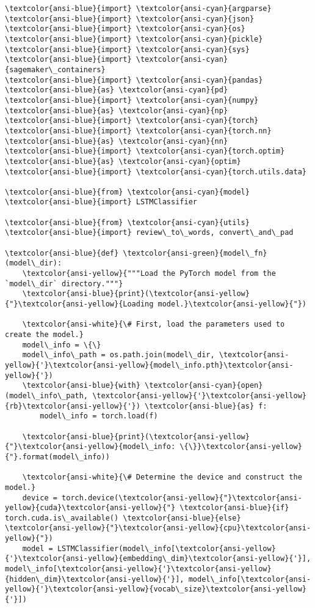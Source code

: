 \documentclass[11pt]{article}
\begin{document}
    \begin{Verbatim}[commandchars=\\\{\}]
\textcolor{ansi-blue}{import} \textcolor{ansi-cyan}{argparse}
\textcolor{ansi-blue}{import} \textcolor{ansi-cyan}{json}
\textcolor{ansi-blue}{import} \textcolor{ansi-cyan}{os}
\textcolor{ansi-blue}{import} \textcolor{ansi-cyan}{pickle}
\textcolor{ansi-blue}{import} \textcolor{ansi-cyan}{sys}
\textcolor{ansi-blue}{import} \textcolor{ansi-cyan}{sagemaker\_containers}
\textcolor{ansi-blue}{import} \textcolor{ansi-cyan}{pandas} \textcolor{ansi-blue}{as} \textcolor{ansi-cyan}{pd}
\textcolor{ansi-blue}{import} \textcolor{ansi-cyan}{numpy} \textcolor{ansi-blue}{as} \textcolor{ansi-cyan}{np}
\textcolor{ansi-blue}{import} \textcolor{ansi-cyan}{torch}
\textcolor{ansi-blue}{import} \textcolor{ansi-cyan}{torch.nn} \textcolor{ansi-blue}{as} \textcolor{ansi-cyan}{nn}
\textcolor{ansi-blue}{import} \textcolor{ansi-cyan}{torch.optim} \textcolor{ansi-blue}{as} \textcolor{ansi-cyan}{optim}
\textcolor{ansi-blue}{import} \textcolor{ansi-cyan}{torch.utils.data}

\textcolor{ansi-blue}{from} \textcolor{ansi-cyan}{model} \textcolor{ansi-blue}{import} LSTMClassifier

\textcolor{ansi-blue}{from} \textcolor{ansi-cyan}{utils} \textcolor{ansi-blue}{import} review\_to\_words, convert\_and\_pad

\textcolor{ansi-blue}{def} \textcolor{ansi-green}{model\_fn}(model\_dir):
    \textcolor{ansi-yellow}{"""Load the PyTorch model from the `model\_dir` directory."""}
    \textcolor{ansi-blue}{print}(\textcolor{ansi-yellow}{"}\textcolor{ansi-yellow}{Loading model.}\textcolor{ansi-yellow}{"})

    \textcolor{ansi-white}{\# First, load the parameters used to create the model.}
    model\_info = \{\}
    model\_info\_path = os.path.join(model\_dir, \textcolor{ansi-yellow}{'}\textcolor{ansi-yellow}{model\_info.pth}\textcolor{ansi-yellow}{'})
    \textcolor{ansi-blue}{with} \textcolor{ansi-cyan}{open}(model\_info\_path, \textcolor{ansi-yellow}{'}\textcolor{ansi-yellow}{rb}\textcolor{ansi-yellow}{'}) \textcolor{ansi-blue}{as} f:
        model\_info = torch.load(f)

    \textcolor{ansi-blue}{print}(\textcolor{ansi-yellow}{"}\textcolor{ansi-yellow}{model\_info: \{\}}\textcolor{ansi-yellow}{"}.format(model\_info))

    \textcolor{ansi-white}{\# Determine the device and construct the model.}
    device = torch.device(\textcolor{ansi-yellow}{"}\textcolor{ansi-yellow}{cuda}\textcolor{ansi-yellow}{"} \textcolor{ansi-blue}{if} torch.cuda.is\_available() \textcolor{ansi-blue}{else} \textcolor{ansi-yellow}{"}\textcolor{ansi-yellow}{cpu}\textcolor{ansi-yellow}{"})
    model = LSTMClassifier(model\_info[\textcolor{ansi-yellow}{'}\textcolor{ansi-yellow}{embedding\_dim}\textcolor{ansi-yellow}{'}], model\_info[\textcolor{ansi-yellow}{'}\textcolor{ansi-yellow}{hidden\_dim}\textcolor{ansi-yellow}{'}], model\_info[\textcolor{ansi-yellow}{'}\textcolor{ansi-yellow}{vocab\_size}\textcolor{ansi-yellow}{'}])


\end{Verbatim}
\end{document}
